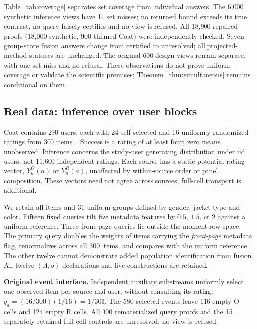 \documentclass[conference]{IEEEtran}
\begin{document}
\begin{table}[t]
\centering
\caption{Fresh-study diagnostics. A query violation is a bound above truth. Denominators count views or queries; reused records are dependent.}
\label{tab:coverage}
\end{table}

Table~\ref{tab:coverage} separates set coverage from individual answers. The 6,000 synthetic inference views have 14 set misses; no returned bound exceeds its true contrast, no query falsely certifies and no view is refused. All 18,900 repaired proofs (18,000 synthetic, 900 thinned Coat) were independently checked. Seven group-score fusion answers change from certified to unresolved; all projected-method statuses are unchanged. The original 600 design views remain separate, with one set miss and no refusal. These observations do not prove uniform coverage or validate the scientific premises; Theorem~\ref{thm:simultaneous} remains conditional on them.



\subsection{Real data: inference over user blocks}\label{sec:coat}
Coat contains 290 users, each with 24 self-selected and 16 uniformly randomized ratings from 300 items~\cite{schnabel2016coat}. Success is a rating of at least four; zero means unobserved. Inference concerns the study-user generating distribution under iid users, not 11,600 independent ratings. Each source has a static potential-rating vector, $Y^O_u(a)$ or $Y^R_u(a)$, unaffected by within-source order or panel composition. These vectors need not agree across sources; full-cell transport is additional.

We retain all items and 31 uniform groups defined by gender, jacket type and color. Fifteen fixed queries tilt five metadata features by $0.5$, $1.5$, or $2$ against a uniform reference. Three front-page queries lie outside the moment row space. The primary query doubles the weights of items carrying the \emph{front-page} metadata flag, renormalizes across all 300 items, and compares with the uniform reference. The other twelve cannot demonstrate added population identification from fusion. All twelve $(\Lambda,\rho)$ declarations and five constructions are retained.

\textbf{Original event interface.} Independent auxiliary substreams uniformly select one observed item per source and user, without consulting its rating; $q_a=(16/300)(1/16)=1/300$. The 580 selected events leave 116 empty O cells and 124 empty R cells. All 900 rematerialized query proofs and the 15 separately retained full-cell controls are unresolved; no view is refused.
\end{document}
